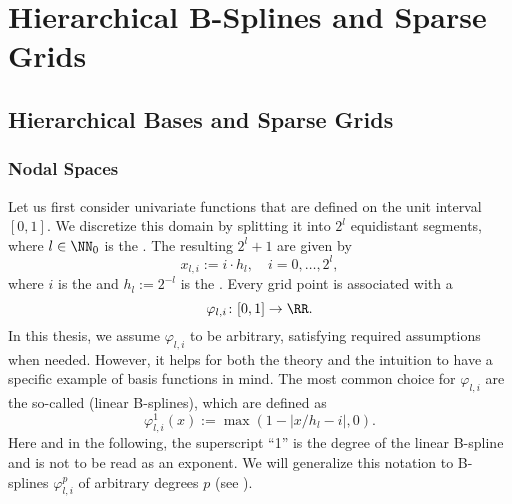 
\chapter{Hierarchical B-Splines and Sparse Grids}
\label{sec:sg}


\section{Hierarchical Bases and Sparse Grids}


\subsection{Nodal Spaces}


Let us first consider univariate functions
that are defined on the unit interval $[0, 1]$.
%
We discretize this domain by splitting it into $2^l$ equidistant segments,
where $l \in \NN_0$ is the .
%
%
%
The resulting $2^l + 1$  are given by
\begin{equation}
  x_{l,i} := i \cdot h_l,\quad
  i = 0, \dotsc, 2^l,
\end{equation}
where $i$ is the  and $h_l := 2^{-l}$ is the .
%
Every grid point is associated with a 
\begin{equation}
  \varphi_{l,i}\colon [0, 1] \to \RR.
\end{equation}
In this thesis, we assume $\varphi_{l,i}$ to be arbitrary,
satisfying required assumptions when needed.
However, it helps for both the theory and the intuition to have a
specific example of basis functions in mind.
%
The most common choice for $\varphi_{l,i}$ are the so-called 
(linear B-splines), which are defined as
\begin{equation}
  \varphi_{l,i}^1(x)
  := \max(1 - |x/h_l - i|, 0).
\end{equation}
Here and in the following,
the superscript ``1'' is the degree of the linear B-spline and
is not to be read as an exponent.
We will generalize this notation to B-splines $\varphi_{l,i}^p$ of
arbitrary degrees $p$ (see ).

